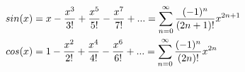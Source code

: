 \documentclass{article}
\begin{document}
\begin{align*}
  sin(x) &= x - {x^3 \over 3!} + {x^5 \over 5!} - {x^7 \over 7!} + ... =
           \sum_{n=0}^\infty {(-1)^n \over (2n+1)!} x^{2n+1}\\
  cos(x) &= 1 - {x^2 \over 2!} + {x^4 \over 4!} - {x^6 \over 6!} + ... =
           \sum_{n=0}^\infty {(-1)^n \over (2n)!} x^{2n}\\
\end{align*}
\end{document}
